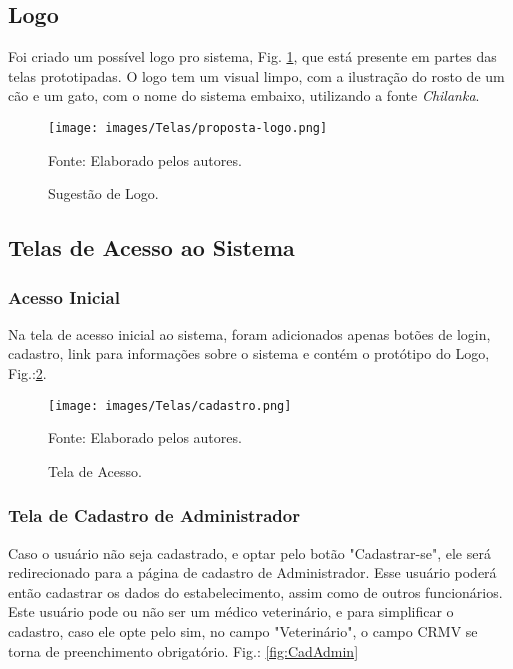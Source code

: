 \documentclass[
    12pt,               %
    openright,          %
    oneside,
    a4paper,            %
    BIBLATEX,           %
    TODO,               %
    english,            %
    brazil              %
    ]{ifsp-spo-inf-ctds}
\begin{document}
    \subsection{Logo}
    Foi criado um possível logo pro sistema, Fig. \ref{fig:logo}, que está presente em partes das telas prototipadas.
    O logo tem um visual limpo, com a ilustração do rosto de um cão e um gato, com o nome do sistema embaixo, utilizando a fonte \emph{Chilanka}.
    \begin{figure}[H]
                \centering
                \caption{Sugestão de Logo.}
                \texttt{[image: images/Telas/proposta-logo.png]}

                \label{fig:logo}
                \centering
        {\footnotesize Fonte: Elaborado pelos autores.}
            \end{figure}

    \subsection{Telas de Acesso ao Sistema}

\subsubsection{Acesso Inicial}
Na tela de acesso inicial ao sistema, foram adicionados apenas botões de login, cadastro, link para informações sobre o sistema e contém o protótipo do Logo, Fig.:\ref{fig:Acesso}.


 \begin{figure}[H]
                \centering
                \caption{Tela de Acesso.}
                \texttt{[image: images/Telas/cadastro.png]}

                \label{fig:Acesso}
                \centering
        {\footnotesize Fonte: Elaborado pelos autores.}
            \end{figure}

\subsubsection{Tela de Cadastro de Administrador}

Caso o usuário não seja cadastrado, e optar pelo botão "Cadastrar-se", ele será redirecionado para a página de cadastro de Administrador. Esse usuário poderá então cadastrar os dados do estabelecimento, assim como de outros funcionários. Este usuário pode ou não ser um médico veterinário, e para simplificar o cadastro, caso ele opte pelo sim, no campo "Veterinário", o campo CRMV se torna de preenchimento obrigatório. Fig.: \ref{fig:CadAdmin}
\end{document}
